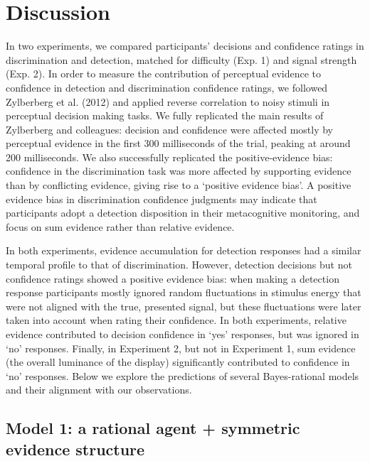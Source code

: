 \documentclass[12pt,twoside]{reedthesis}
\begin{document}
\hypertarget{discussion-2}{%
\section{Discussion}\label{discussion-2}}

In two experiments, we compared participants' decisions and confidence ratings in discrimination and detection, matched for difficulty (Exp. 1) and signal strength (Exp. 2). In order to measure the contribution of perceptual evidence to confidence in detection and discrimination confidence ratings, we followed Zylberberg et al. (2012) and applied reverse correlation to noisy stimuli in perceptual decision making tasks. We fully replicated the main results of Zylberberg and colleagues: decision and confidence were affected mostly by perceptual evidence in the first 300 milliseconds of the trial, peaking at around 200 milliseconds. We also successfully replicated the positive-evidence bias: confidence in the discrimination task was more affected by supporting evidence than by conflicting evidence, giving rise to a `positive evidence bias'. A positive evidence bias in discrimination confidence judgments may indicate that participants adopt a detection disposition in their metacognitive monitoring, and focus on sum evidence rather than relative evidence.

In both experiments, evidence accumulation for detection responses had a similar temporal profile to that of discrimination. However, detection decisions but not confidence ratings showed a positive evidence bias: when making a detection response participants mostly ignored random fluctuations in stimulus energy that were not aligned with the true, presented signal, but these fluctuations were later taken into account when rating their confidence. In both experiments, relative evidence contributed to decision confidence in `yes' responses, but was ignored in `no' responses. Finally, in Experiment 2, but not in Experiment 1, sum evidence (the overall luminance of the display) significantly contributed to confidence in `no' responses. Below we explore the predictions of several Bayes-rational models and their alignment with our observations.

\hypertarget{model-1-a-rational-agent-symmetric-evidence-structure}{%
\subsection{Model 1: a rational agent + symmetric evidence structure}\label{model-1-a-rational-agent-symmetric-evidence-structure}}
\end{document}
